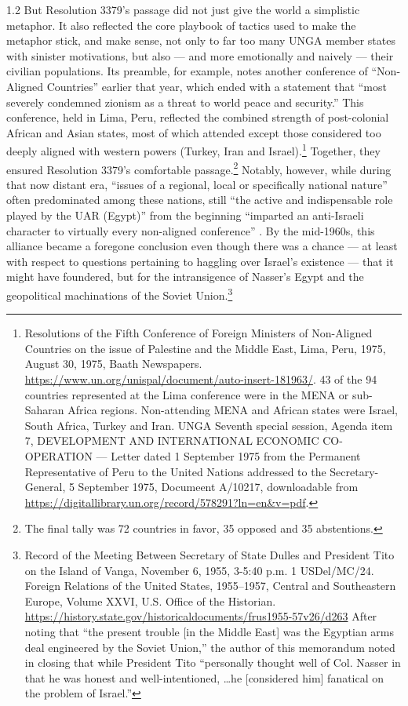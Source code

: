 \documentclass[../unravbook.tex]{subfiles}
\begin{document}
\begin{spacing}{1.2}
But Resolution 3379's passage did not just give the world a simplistic metaphor. It also reflected the core playbook of tactics used to make the metaphor stick, and make sense, not only to far too many UNGA member states with sinister motivations, but also --- and more emotionally and naively --- their civilian populations. Its preamble, for example, notes another conference of ``Non-Aligned Countries'' earlier that year, which ended with a statement that ``most severely condemned zionism as a threat to world peace and security.'' This conference, held in Lima, Peru, reflected the combined strength of post-colonial African and Asian states, most of which attended except those considered too deeply aligned with western powers (Turkey, Iran and Israel).\footnote{Resolutions of the Fifth Conference of Foreign Ministers of Non-Aligned Countries on the issue of Palestine and the Middle East, Lima, Peru, 1975, August 30, 1975, Baath Newspapers. \url{https://www.un.org/unispal/document/auto-insert-181963/}. 43 of the 94 countries represented at the Lima conference were in the MENA or sub-Saharan Africa regions. Non-attending MENA and African states were Israel, South Africa, Turkey and Iran. UNGA Seventh special session, Agenda item 7, DEVELOPMENT AND INTERNATIONAL ECONOMIC CO-OPERATION --- Letter dated 1 September 1975 from the Permanent Representative of Peru to the United Nations addressed to the Secretary-General, 5 September 1975, Documeent A/10217, downloadable from \url{https://digitallibrary.un.org/record/578291?ln=en&v=pdf}.} Together, they ensured Resolution 3379's comfortable passage.\footnote{The final tally was 72 countries in favor, 35 opposed and 35 abstentions.} Notably, however, while during that now distant era, ``issues of a regional, local or specifically national nature'' often predominated among these nations, still ``the active and indispensable role played by the UAR (Egypt)'' from the beginning ``imparted an anti-Israeli character to virtually every non-aligned conference'' \parencite[157]{Bandyopadhyaya-1977}. By the mid-1960s, this alliance became a foregone conclusion even though there was a chance --- at least with respect to questions pertaining to haggling over Israel's existence --- that it might have foundered, but for the intransigence of Nasser's Egypt and the geopolitical machinations of the Soviet Union.\footnote{Record of the Meeting Between Secretary of State Dulles and President Tito on the Island of Vanga, November 6, 1955, 3-5:40 p.m. 1 USDel/MC/24. Foreign Relations of the United States, 1955--1957, Central and Southeastern Europe, Volume XXVI, U.S. Office of the Historian. \url{https://history.state.gov/historicaldocuments/frus1955-57v26/d263} After noting that  \enquote{the present trouble [in the Middle East] was the Egyptian arms deal engineered by the Soviet Union,} the author of this memorandum noted in closing that while President Tito \enquote{personally thought well of Col. Nasser in that he was honest and well-intentioned, \ldots he [considered him] fanatical on the problem of Israel.}} 
 

\end{spacing}
\end{document}
